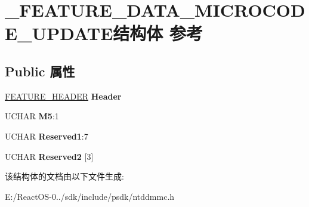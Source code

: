 \hypertarget{struct___f_e_a_t_u_r_e___d_a_t_a___m_i_c_r_o_c_o_d_e___u_p_d_a_t_e}{}\section{\+\_\+\+F\+E\+A\+T\+U\+R\+E\+\_\+\+D\+A\+T\+A\+\_\+\+M\+I\+C\+R\+O\+C\+O\+D\+E\+\_\+\+U\+P\+D\+A\+T\+E结构体 参考}
\label{struct___f_e_a_t_u_r_e___d_a_t_a___m_i_c_r_o_c_o_d_e___u_p_d_a_t_e}
\subsection*{Public 属性}
\begin{DoxyCompactItemize}
\item 
\mbox{\label{struct___f_e_a_t_u_r_e___d_a_t_a___m_i_c_r_o_c_o_d_e___u_p_d_a_t_e_a7706198b44df75f63cbd5264877bd8a5}} 
\hyperlink{struct___f_e_a_t_u_r_e___h_e_a_d_e_r}{F\+E\+A\+T\+U\+R\+E\+\_\+\+H\+E\+A\+D\+ER} {\bfseries Header}
\item 
\mbox{\label{struct___f_e_a_t_u_r_e___d_a_t_a___m_i_c_r_o_c_o_d_e___u_p_d_a_t_e_ab326f13041b81f5e3d98f656e00eb486}} 
U\+C\+H\+AR {\bfseries M5}\+:1
\item 
\mbox{\label{struct___f_e_a_t_u_r_e___d_a_t_a___m_i_c_r_o_c_o_d_e___u_p_d_a_t_e_a6a26645b77710f8f52f372fd5e71eb57}} 
U\+C\+H\+AR {\bfseries Reserved1}\+:7
\item 
\mbox{\label{struct___f_e_a_t_u_r_e___d_a_t_a___m_i_c_r_o_c_o_d_e___u_p_d_a_t_e_a1f6f295d85eb01f878b9f3cd6f237c6d}} 
U\+C\+H\+AR {\bfseries Reserved2} \mbox{[}3\mbox{]}
\end{DoxyCompactItemize}


该结构体的文档由以下文件生成\+:\begin{DoxyCompactItemize}
\item 
E\+:/\+React\+O\+S-\/0../sdk/include/psdk/ntddmmc.\+h\end{DoxyCompactItemize}
